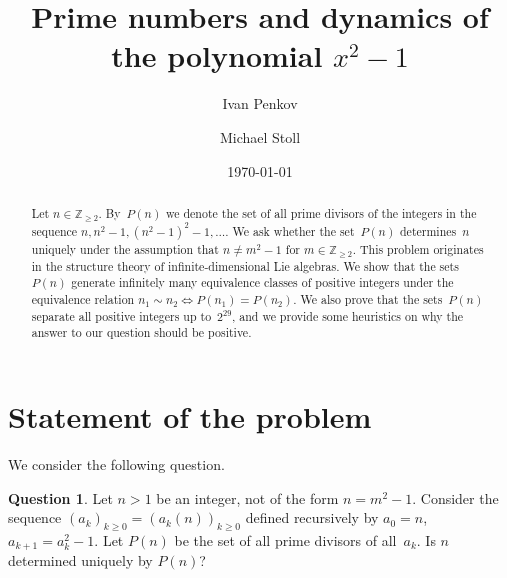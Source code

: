 \documentclass[12pt,a4paper]{amsart}
\newcommand{\Z}{{\mathbb Z}}
\theoremstyle{definition}
\newtheorem{Question}[Theorem]{Question}
\numberwithin{equation}{section}
\begin{document}
\title{Prime numbers and dynamics of the polynomial $x^2 - 1$}

\author{Ivan Penkov}
\address{(I. P.) Constructor University, 28759 Bremen, Germany}

\author{Michael Stoll}
\address{(M. S.) Mathematisches Institut,
         Universität Bayreuth,
         95440 Bayreuth, Germany}

\date{\today}


\begin{abstract}
  Let $n \in \Z_{\geqslant 2}$. By~$P(n)$ we denote the set of all prime divisors of the integers
  in the sequence $n, n^2-1, (n^2-1)^2-1, \dots$. We ask whether the set~$P(n)$ determines~$n$
  uniquely under the assumption that $n \neq m^2-1$ for $m \in \Z_{\geqslant 2}$.
  This problem originates in the structure theory of infinite-dimensional Lie algebras. We show
  that the sets~$P(n)$ generate infinitely many equivalence classes of positive integers under
  the equivalence relation $n_1 \sim n_2 \iff P(n_1) = P(n_2)$. We also prove that the sets~$P(n)$
  separate all positive integers up to~$2^{29}$, and we provide some heuristics on why the answer
  to our question should be positive.
\end{abstract}

\maketitle


\section{Statement of the problem} %

We consider the following question.

\begin{Question} \label{Q1}
  Let $n > 1$ be an integer, not of the form $n = m^2 - 1$.
  Consider the sequence $(a_k)_{k \geqslant 0} = (a_k(n))_{k \geqslant 0}$
  defined recursively by $a_0 = n$, $a_{k+1} = a_k^2 - 1$.
  Let $P(n)$ be the set of all prime divisors of all~$a_k$.
  Is $n$ determined uniquely by $P(n)$?
\end{Question}
\end{document}

